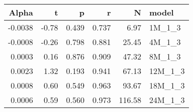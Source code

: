 \begin{table}[ht]
\centering
\begin{tabular}{rrrrrl}
  \hline
Alpha & t & p & r & N & model \\ 
  \hline
-0.0038 & -0.78 & 0.439 & 0.737 & 6.97 & 1M\_1\_3 \\ 
  -0.0008 & -0.26 & 0.798 & 0.881 & 25.45 & 4M\_1\_3 \\ 
  0.0003 & 0.16 & 0.876 & 0.909 & 47.32 & 8M\_1\_3 \\ 
  0.0023 & 1.32 & 0.193 & 0.941 & 67.13 & 12M\_1\_3 \\ 
  0.0008 & 0.60 & 0.549 & 0.963 & 93.67 & 18M\_1\_3 \\ 
  0.0006 & 0.59 & 0.560 & 0.973 & 116.58 & 24M\_1\_3 \\ 
   \hline
\end{tabular}
\end{table}

